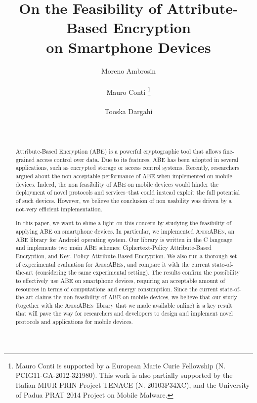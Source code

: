 \documentclass{sig-alternate-2013}
\newcommand{\andraben}{\textsc{AndrABEn}}
\begin{document}
\title{On the Feasibility of Attribute-Based Encryption \\ on Smartphone Devices}



\author{
\alignauthor Moreno Ambrosin\\
       \\
\alignauthor Mauro Conti \thanks{\small Mauro Conti is supported by a European Marie Curie Fellowship (N. PCIG11-GA-2012-321980). This work is also partially supported by the Italian MIUR PRIN Project TENACE  (N. 20103P34XC), and the University of Padua PRAT 2014 Project on Mobile Malware.}\\
       \\
\alignauthor Tooska Dargahi\\
       \\
     \\
}

\maketitle
\begin{abstract}

\sloppy
Attribute-Based Encryption (ABE) is a powerful cryptographic tool that allows fine-grained access control over data.
Due to its features, ABE has been adopted in several applications, such as encrypted storage or access control systems.
Recently, researchers argued about the non acceptable performance of ABE when implemented on mobile devices. Indeed, the non feasibility of ABE on mobile devices would hinder the deployment of novel protocols and services--that could instead exploit the full potential of such devices.
However, we believe the conclusion of non usability was driven by a not-very efficient implementation.

In this paper, we want to shine a light on this concern by studying the feasibility of applying ABE on smartphone devices. 
 In particular, we implemented \andraben, an ABE library for Android operating system. Our library is written in the C language and implements two main ABE schemes:
Ciphertext-Policy Attribute-Based Encryption, and Key- Policy Attribute-Based Encryption. 
We also run a thorough set of experimental evaluation for \andraben, and compare it with the current state-of-the-art (considering the same experimental setting). The results confirm the possibility to effectively use ABE on smartphone devices, requiring an acceptable amount of resources in terms of computations and energy consumption.
Since the current state-of-the-art claims the non feasibility of ABE on mobile devices, we believe that our study (together with the \andraben~library that we made available online) is a key result that will pave the way for researchers and developers to design and implement novel protocols and applications for mobile devices.
\end{abstract}
\end{document}
